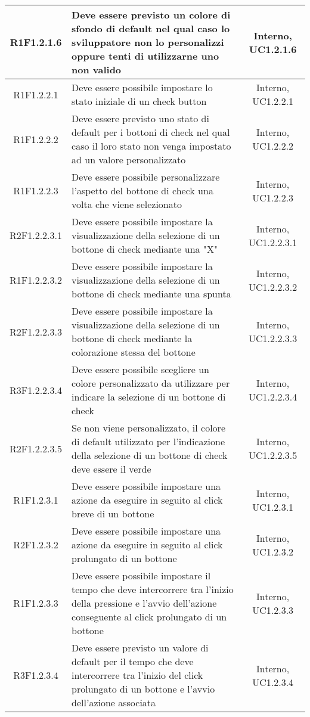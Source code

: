 \begin{longtable}{|c|>{\centering}m{7cm}|c|}
			\hline
			R1F1.2.1.6 & Deve essere previsto un colore di sfondo di default nel qual caso lo sviluppatore non lo personalizzi oppure tenti di utilizzarne uno non valido & Interno, UC1.2.1.6 \\
			\hline
			R1F1.2.2.1 & Deve essere possibile impostare lo stato iniziale di un check button & Interno, UC1.2.2.1 \\
		\hline
		R1F1.2.2.2 & Deve essere previsto uno stato di default per i bottoni di check nel qual caso il loro stato non venga impostato ad un valore personalizzato & Interno, UC1.2.2.2 \\
		\hline
		R1F1.2.2.3 & Deve essere possibile personalizzare l'aspetto del bottone di check una volta che viene selezionato & Interno, UC1.2.2.3 \\
		\hline
		R2F1.2.2.3.1 & Deve essere possibile impostare la visualizzazione della selezione di un bottone di check mediante una "X" & Interno, UC1.2.2.3.1 \\ 
		\hline
		R1F1.2.2.3.2 & Deve essere possibile impostare la visualizzazione della selezione di un bottone di check mediante una spunta & Interno, UC1.2.2.3.2 \\ 
		\hline
		R2F1.2.2.3.3 & Deve essere possibile impostare la visualizzazione della selezione di un bottone di check mediante la colorazione stessa del bottone & Interno, UC1.2.2.3.3 \\ 
		\hline
		R3F1.2.2.3.4 & Deve essere possibile scegliere un colore personalizzato da utilizzare per indicare la selezione di un bottone di check & Interno, UC1.2.2.3.4 \\ 
		\hline
		R2F1.2.2.3.5 & Se non viene personalizzato, il colore di default utilizzato per l'indicazione della selezione di un bottone di check deve essere il verde & Interno, UC1.2.2.3.5 \\
		\hline
		R1F1.2.3.1 & Deve essere possibile impostare una azione da eseguire in seguito al click breve di un bottone & Interno, UC1.2.3.1\\ 
		\hline
		R2F1.2.3.2 & Deve essere possibile impostare una azione da eseguire in seguito al click prolungato di un bottone & Interno, UC1.2.3.2\\ 
		\hline
		R1F1.2.3.3 & Deve essere possibile impostare il tempo che deve intercorrere tra l'inizio della pressione e l'avvio dell'azione conseguente al click prolungato di un bottone & Interno, UC1.2.3.3\\ 
		\hline
		R3F1.2.3.4 & Deve essere previsto un valore di default per il tempo che deve intercorrere tra l'inizio del click prolungato di un bottone e l'avvio dell'azione associata & Interno, UC1.2.3.4\\ 

\end{longtable}
